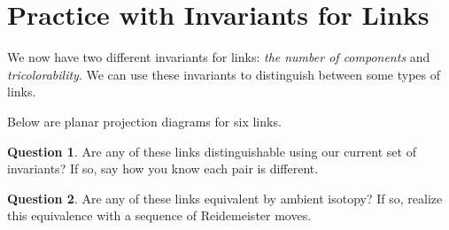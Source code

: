 \documentclass[12pt,letterpaper]{article}
\theoremstyle{definition}
\newtheorem{question}{Question}
\begin{document}
\setlength{\parskip}{1ex plus 0.5ex minus 0.2ex}
\setlength{\parindent}{0pt}

\pagestyle{fancy}
\cfoot{}


\section*{Practice with Invariants for Links}

We now have two different invariants for links: \emph{the number of components} and \emph{tricolorability}.
We can use these invariants to distinguish between some types of links.

Below are planar projection diagrams for six links. 


\begin{question} 
Are any of these links distinguishable using our current set of invariants?
If so, say how you know each pair is different.
\end{question}


\begin{question} 
Are any of these links equivalent by ambient isotopy? 
If so, realize this equivalence with a sequence of Reidemeister moves.
\end{question}
\end{document}
